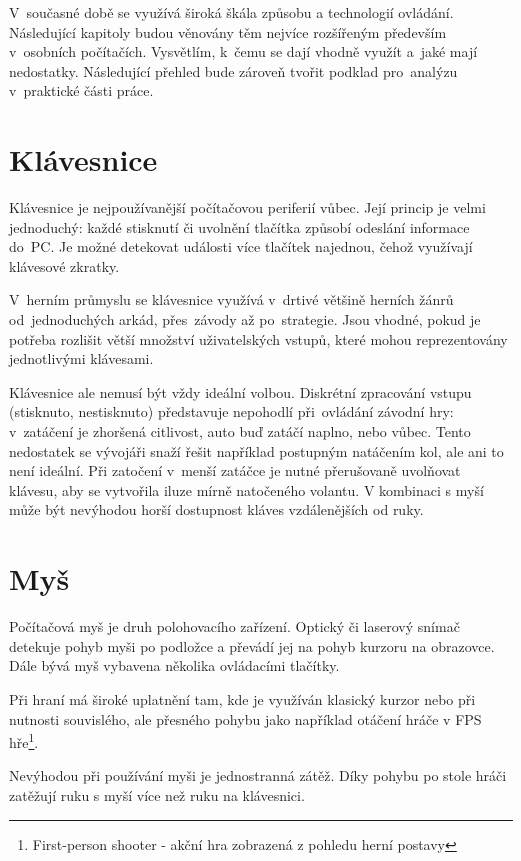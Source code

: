 \documentclass[thesis=B,czech,hidelinks]{FITthesis}[2012/06/26] %
\begin{document}
V~současné době se využívá široká škála způsobu a technologií ovládání. Následující kapitoly budou věnovány těm nejvíce rozšířeným především v~osobních počítačích. Vysvětlím, k~čemu se dají vhodně využít a~jaké mají nedostatky. Následující přehled bude zároveň tvořit podklad pro~analýzu v~praktické části práce.

\section{Klávesnice}

Klávesnice je nejpoužívanější počítačovou periferií vůbec. Její princip je velmi jednoduchý: každé stisknutí či uvolnění tlačítka způsobí odeslání informace do~PC. Je možné detekovat události více tlačítek najednou, čehož využívají klávesové zkratky.

V~herním průmyslu se klávesnice využívá v~drtivé většině herních žánrů od~jednoduchých arkád, přes~závody až po~strategie. Jsou vhodné, pokud je potřeba rozlišit větší množství uživatelských vstupů, které mohou reprezentovány jednotlivými klávesami.

Klávesnice ale nemusí být vždy ideální volbou. Diskrétní zpracování vstupu (stisknuto, nestisknuto) představuje nepohodlí při~ovládání závodní hry: v~zatáčení je zhoršená citlivost, auto buď zatáčí naplno, nebo vůbec. Tento nedostatek se vývojáři snaží řešit například postupným natáčením kol, ale ani to není ideální. Při zatočení v~menší zatáčce je nutné přerušovaně uvolňovat klávesu, aby se vytvořila iluze mírně natočeného volantu. V kombinaci s myší může být nevýhodou horší dostupnost kláves vzdálenějších od ruky.

\section{Myš}

Počítačová myš je druh polohovacího zařízení. Optický či laserový snímač detekuje pohyb myši po podložce a převádí jej na pohyb kurzoru na obrazovce. Dále bývá myš vybavena několika ovládacími tlačítky.

Při hraní má široké uplatnění tam, kde je využíván klasický kurzor nebo při nutnosti souvislého, ale přesného pohybu jako například otáčení hráče v FPS hře\footnote{First-person shooter - akční hra zobrazená z pohledu herní postavy}.

Nevýhodou při používání myši je jednostranná zátěž. Díky pohybu po stole hráči zatěžují ruku s myší více než ruku na klávesnici.
\end{document}
